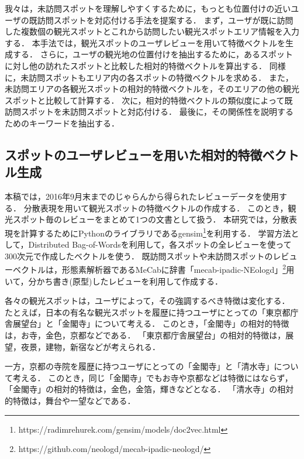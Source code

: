 \documentclass[submit]{ipsj}
\begin{document}
我々は，未訪問スポットを理解しやすくするために，もっとも位置付けの近いユーザの既訪問スポットを対応付ける手法を提案する．
まず，ユーザが既に訪問した複数個の観光スポットとこれから訪問したい観光スポットエリア情報を入力する．
本手法では，観光スポットのユーザレビューを用いて特徴ベクトルを生成する．
さらに，ユーザの観光地の位置付けを抽出するために，あるスポットに対し他の訪れたスポットと比較した相対的特徴ベクトルを算出する．
同様に，未訪問スポットもエリア内の各スポットの特徴ベクトルを求める．
また，未訪問エリアの各観光スポットの相対的特徴ベクトルを，そのエリアの他の観光スポットと比較して計算する．
次に，相対的特徴ベクトルの類似度によって既訪問スポットを未訪問スポットと対応付ける．
最後に，その関係性を説明するためのキーワードを抽出する．

\subsection{スポットのユーザレビューを用いた相対的特徴ベクトル生成}
\label{subsec:スポットのレビューから相対的特徴ベクトル生成}
本稿では，2016年9月末までのじゃらんから得られたレビューデータを使用する．
分散表現\cite{Codd06}を用いて観光スポットの特徴ベクトルの作成する．
このとき，観光スポット毎のレビューをまとめて1つの文書として扱う．
本研究では，分散表現を計算するためにPythonのライブラリであるgensim\footnote{https://radimrehurek.com/gensim/models/doc2vec.html}を利用する．
学習方法として，Distributed Bag-of-Wordsを利用して，各スポットの全レビューを使って300次元で作成したベクトルを使う．
既訪問スポットや未訪問スポットのレビューベクトルは，形態素解析器であるMeCab\cite{Codd07}に辞書「mecab-ipadic-NEologd」\footnote{https://github.com/neologd/mecab-ipadic-neologd/}用いて，分かち書き(原型)したレビューを利用して作成する．

各々の観光スポットは，ユーザによって，その強調するべき特徴は変化する．
たとえば，日本の有名な観光スポットを履歴に持つユーザにとっての「東京都庁舎展望台」と「金閣寺」について考える．
このとき，「金閣寺」の相対的特徴は，お寺，金色，京都などである．
「東京都庁舎展望台」の相対的特徴は，展望，夜景，建物，新宿などが考えられる．

一方，京都の寺院を履歴に持つユーザにとっての「金閣寺」と「清水寺」について考える．
このとき，同じ「金閣寺」でもお寺や京都などは特徴にはならず，「金閣寺」の相対的特徴は，金色，金箔，輝きなどとなる．
「清水寺」の相対的特徴は，舞台や一望などである．
\end{document}
